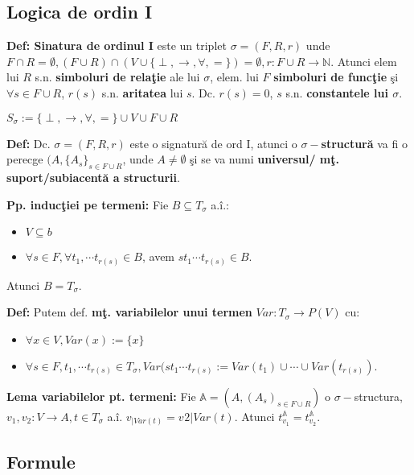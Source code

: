 \documentclass{article}
\begin{document}
\subsection{Logica de ordin I}

\textbf{Def: Sinatura de ordinul I} este un triplet $\sigma=(F,R,r)$ unde $F\cap R=\emptyset, (F\cup R)\cap(V\cup \{\perp,\rightarrow,\forall,=\})=\emptyset,r:F\cup R\rightarrow\mathbb N$. Atunci elem lui $R$ s.n. \textbf{simboluri de rela\c tie} ale lui $\sigma$, elem. lui $F$ \textbf{simboluri de func\c tie} \c si $\forall s\in F\cup R$, $r(s)$ s.n. \textbf{aritatea} lui $s$. Dc. $r(s)=0$, $s$ s.n. \textbf{constantele lui $\sigma$}.

$S_\sigma:=\{\perp,\rightarrow,\forall,=\}\cup V\cup F\cup R$

\textbf{Def:} Dc. $\sigma=(F,R,r)$ este o signatur\u a de ord I, atunci o $\sigma-$\textbf{structur\u a} va fi o perecge $(A,\{A_s\}_{s\in F\cup R}$, unde $A\neq\emptyset$ \c si se va numi \textbf{universul/ m\c t. suport/subiacent\u a a structurii}.

\textbf{Pp. induc\c tiei pe termeni:} Fie $B\subseteq T_\sigma$ a.\^ i.:
\begin{itemize}
    \item $V\subseteq b$
    \item $\forall s\in F,\forall t_1,\cdots t_{r(s)}\in B$, avem $st_1\cdots t_{r(s)}\in B$.
\end{itemize}
Atunci $B=T_\sigma$.

\textbf{Def:} Putem def. \textbf{m\c t. variabilelor unui termen} $Var:T_\sigma\rightarrow P(V)$ cu:
\begin{itemize}
    \item $\forall x\in V, Var(x):=\{x\}$
    \item $\forall s\in F,t_1,\cdots t_{r(s)}\in T_\sigma, Var(st_1\cdots t_{r(s)}:=Var(t_1)\cup\cdots\cup Var(t_{r(s)})$.
\end{itemize}

\textbf{Lema variabilelor pt. termeni:} Fie $\mathbb A=(A,(A_s)_{s\in F\cup R})$ o $\sigma-$structura, $v_1,v_2:V\rightarrow A,t\in T_\sigma$ a.\^ i. $v_{|Var(t)}=v_{}2|Var(t)$. Atunci $t_{v_1}^{\mathbb A}=t_{v_2}^{\mathbb A}$.

\subsection{Formule}
\end{document}
